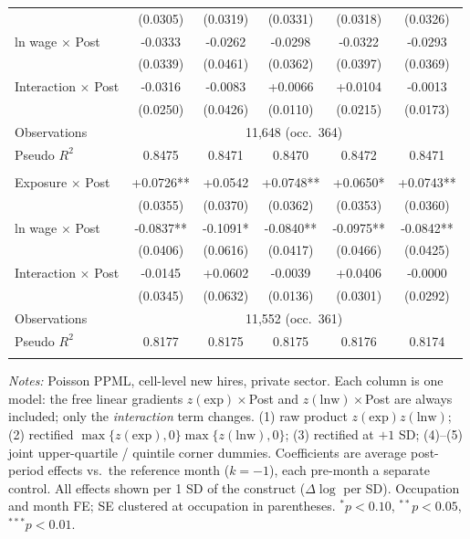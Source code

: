 \begin{table}[H]
\begin{tabular}{lccccc}
 & (0.0305) & (0.0319) & (0.0331) & (0.0318) & (0.0326) \\
ln wage $\times$ Post & -0.0333 & -0.0262 & -0.0298 & -0.0322 & -0.0293 \\
 & (0.0339) & (0.0461) & (0.0362) & (0.0397) & (0.0369) \\
Interaction $\times$ Post & -0.0316 & -0.0083 & +0.0066 & +0.0104 & -0.0013 \\
 & (0.0250) & (0.0426) & (0.0110) & (0.0215) & (0.0173) \\
\quad Observations & \multicolumn{5}{c}{11,648 \quad (occ.\ 364)} \\
\quad Pseudo $R^2$ & 0.8475 & 0.8471 & 0.8470 & 0.8472 & 0.8471 \\
\addlinespace
\multicolumn{6}{@{}l}{\textit{Panel: ages 51–60}} \\
Exposure $\times$ Post & +0.0726** & +0.0542 & +0.0748** & +0.0650* & +0.0743** \\
 & (0.0355) & (0.0370) & (0.0362) & (0.0353) & (0.0360) \\
ln wage $\times$ Post & -0.0837** & -0.1091* & -0.0840** & -0.0975** & -0.0842** \\
 & (0.0406) & (0.0616) & (0.0417) & (0.0466) & (0.0425) \\
Interaction $\times$ Post & -0.0145 & +0.0602 & -0.0039 & +0.0406 & -0.0000 \\
 & (0.0345) & (0.0632) & (0.0136) & (0.0301) & (0.0292) \\
\quad Observations & \multicolumn{5}{c}{11,552 \quad (occ.\ 361)} \\
\quad Pseudo $R^2$ & 0.8177 & 0.8175 & 0.8175 & 0.8176 & 0.8174 \\
\addlinespace
\bottomrule
\end{tabular}
\begin{minipage}{\linewidth}\vspace{2pt}\footnotesize
\emph{Notes:} Poisson PPML, cell-level new hires, private sector. Each column is one model: the free linear gradients $z(\text{exp})\times$Post and $z(\text{lnw})\times$Post are always included; only the \emph{interaction} term changes. (1) raw product $z(\text{exp})z(\text{lnw})$; (2) rectified $\max\{z(\text{exp}),0\}\max\{z(\text{lnw}),0\}$; (3) rectified at $+1$ SD; (4)--(5) joint upper-quartile / quintile corner dummies. Coefficients are average post-period effects vs.\ the reference month ($k{=}{-}1$), each pre-month a separate control. All effects shown per 1 SD of the construct ($\Delta\log$ per SD). Occupation and month FE; SE clustered at occupation in parentheses. $^{*}p<0.10$, $^{**}p<0.05$, $^{***}p<0.01$.
\end{minipage}
\end{table}